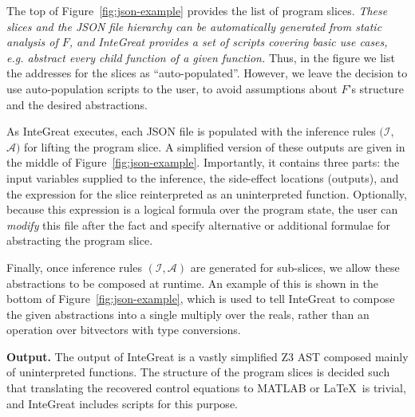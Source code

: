 The top of Figure~\ref{fig:json-example} provides the list of program slices.
\emph{These slices and the JSON file hierarchy can be automatically generated from static analysis of $F$, and InteGreat provides a set of scripts covering basic use cases, e.g. abstract every child function of a given function.}
Thus, in the figure we list the addresses for the slices as ``auto-populated''.
However, we leave the decision to use auto-population scripts to the user, to avoid assumptions about $F$'s structure and the desired abstractions.

As InteGreat executes, each JSON file is populated with the inference rules $(\mathcal{I}$, $\mathcal{A})$ for lifting the program slice.
A simplified version of these outputs are given in the middle of Figure~\ref{fig:json-example}.
Importantly, it contains three parts: the input variables supplied to the inference, the side-effect locations (outputs), and the expression for the slice reinterpreted as an uninterpreted function.
Optionally, because this expression is a logical formula over the program state, the user can \emph{modify} this file after the fact and specify alternative or additional formulae for abstracting the program slice.

Finally, once inference rules $(\mathcal{I}, \mathcal{A})$ are generated for sub-slices, we allow these abstractions to be composed at runtime.
An example of this is shown in the bottom of Figure~\ref{fig:json-example}, which is used to tell InteGreat to compose the given abstractions into a single multiply over the reals, rather than an operation over bitvectors with type conversions.




\label{fig:json-abst-example}
\textbf{Output.}
The output of InteGreat is a vastly simplified Z3 AST composed mainly of uninterpreted functions.
The structure of the program slices is decided such that translating the recovered control equations to MATLAB or \LaTeX\ is trivial, and InteGreat includes scripts for this purpose.

